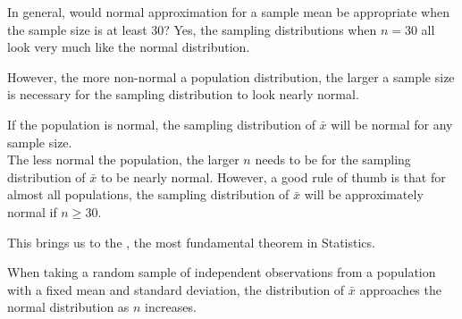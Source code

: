 \begin{example}{In general, would normal approximation for a sample mean be appropriate when the sample size is at least 30?}
Yes, the sampling distributions when $n = 30$ all look very much like the normal distribution.

However, the more non-normal a population distribution, the larger a sample size is necessary for the sampling distribution to look nearly normal.
\end{example}

\begin{termBox}{
If the population is normal, the sampling distribution of $\bar{x}$ will be normal for any sample size. \\[2mm]
The less normal the population, the larger $n$ needs to be for the sampling distribution of $\bar{x}$ to be nearly normal.  However, a good rule of thumb is that for almost all populations, the sampling distribution of $\bar{x}$ will be approximately normal if $n \ge 30$.}
\end{termBox}

This brings us to the , the most fundamental theorem in Statistics.

\begin{termBox}{
When taking a random sample of independent observations from a population with a fixed mean and standard deviation, the distribution of $\bar{x}$ approaches the normal distribution as $n$ increases.}
\end{termBox}



